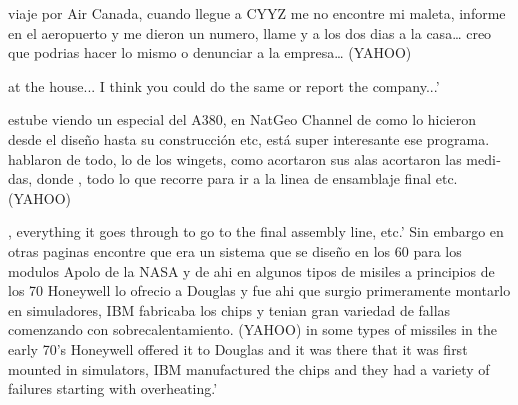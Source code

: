 \documentclass[output=paper]{langscibook}
\begin{document}
\eanoraggedright\label{ex:pierre:14}
\begin{otherlanguage}{spanish}
viaje por Air Canada, cuando llegue a CYYZ me no encontre mi maleta, informe en el aeropuerto y me dieron un numero, llame y a los dos dias     a la casa… creo que podrias hacer lo mismo o denunciar a la empresa… (YAHOO)
\end{otherlanguage}\pagebreak
{} { } {   } {at the house... I think you could do the same or report the company..}{{.’}}
\ex\label{ex:pierre:15}
\begin{otherlanguage}{spanish}
estube viendo un especial del A380, en NatGeo Channel de como lo hicieron desde el diseño hasta su construcción etc, está super interesante ese programa. hablaron de todo, lo de los wingets, como acortaron sus alas acortaron las medidas, donde  , todo lo que recorre para ir a la linea de ensamblaje final etc. (YAHOO)
\end{otherlanguage}
 {  }{, everything it goes through to go to the final assembly line, etc}{{.’}}
\ex\label{ex:pierre:16}
{{Sin embargo en otras paginas encontre que era un sistema que se diseño en los 60 para los modulos Apolo de la NASA y de ahi} }{}{ {en algunos tipos de misiles a principios de los 70 Honeywell lo ofrecio a Douglas y fue ahi que surgio primeramente montarlo en simuladores, IBM fabricaba los chips y tenian gran variedad de fallas comenzando con sobrecalentamiento.} }{(YAHOO)}
 {} {in some types of missiles in the early 70's Honeywell offered it to Douglas and it was there that it was first mounted in} {simulators, IBM manufactured the chips and they had a variety of failures starting with overheating.’}
\z 
\end{document}
